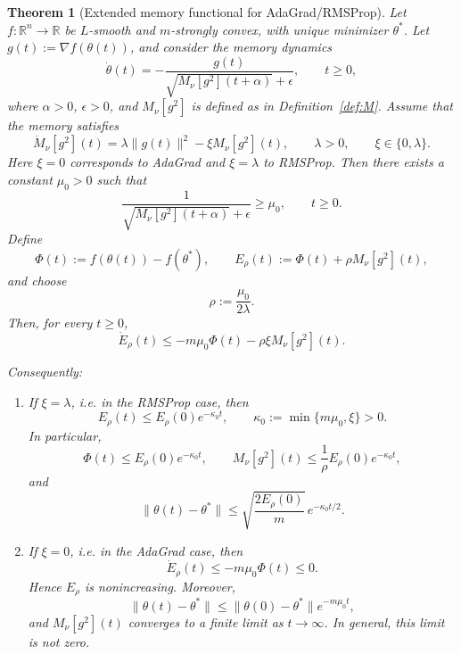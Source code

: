 \documentclass[10pt,a4paper]{amsart}
\newtheorem{theorem}{Theorem}
\begin{document}
\begin{theorem}[Extended memory functional for AdaGrad/RMSProp]
\label{thm:extended_memory_adagrad_rmsprop}
Let \(f:\mathbb R^n\to\mathbb R\) be \(L\)-smooth and \(m\)-strongly convex, with unique minimizer \(\theta^*\). Let \(g(t):=\nabla f(\theta(t))\), and consider the memory dynamics
\begin{equation}
\label{eq:shifted_memory_dynamics_thm2}
\dot\theta(t)
=
-
\frac{g(t)}
{\sqrt{M_\nu[g^2](t+\alpha)}+\epsilon},
\qquad t\ge 0,
\end{equation}
where \(\alpha>0\), \(\epsilon>0\), and \(M_\nu[g^2]\) is defined as in Definition~\ref{def:M}. Assume that the memory satisfies
\begin{equation}
\label{eq:memory_ode_thm2}
\dot M_\nu[g^2](t)
=
\lambda \|g(t)\|^2-\xi M_\nu[g^2](t),
\qquad 
\lambda>0,
\qquad 
\xi\in\{0,\lambda\}.
\end{equation}
Here \(\xi=0\) corresponds to AdaGrad and \(\xi=\lambda\) to RMSProp. Then there exists a constant \(\mu_0>0\) such that
\[
\frac{1}{\sqrt{M_\nu[g^2](t+\alpha)}+\epsilon}
\ge
\mu_0,
\qquad t\ge 0.
\]
Define
\[
\Phi(t):=f(\theta(t))-f(\theta^*),
\qquad
E_\rho(t):=\Phi(t)+\rho M_\nu[g^2](t),
\]
and choose
\[
\rho:=\frac{\mu_0}{2\lambda}.
\]
Then, for every \(t\ge 0\),
\begin{equation}
\label{eq:E_dissipation_thm2}
\dot E_\rho(t)
\le
-
m\mu_0\Phi(t)
-
\rho\xi M_\nu[g^2](t).
\end{equation}

Consequently:
\begin{enumerate}
\item If \(\xi=\lambda\), i.e. in the RMSProp case, then
\[
E_\rho(t)
\le
E_\rho(0)e^{-\kappa_0 t},
\qquad
\kappa_0:=\min\{m\mu_0,\xi\}>0.
\]
In particular,
\[
\Phi(t)\le E_\rho(0)e^{-\kappa_0 t},
\qquad
M_\nu[g^2](t)
\le
\frac{1}{\rho}E_\rho(0)e^{-\kappa_0 t},
\]
and
\[
\|\theta(t)-\theta^*\|
\le
\sqrt{\frac{2E_\rho(0)}{m}}\,e^{-\kappa_0 t/2}.
\]

\item If \(\xi=0\), i.e. in the AdaGrad case, then
\[
\dot E_\rho(t)\le -m\mu_0\Phi(t)\le 0.
\]
Hence \(E_\rho\) is nonincreasing. Moreover,
\[
\|\theta(t)-\theta^*\|
\le
\|\theta(0)-\theta^*\|e^{-m\mu_0 t},
\]
and \(M_\nu[g^2](t)\) converges to a finite limit as \(t\to\infty\). In general, this limit is not zero.
\end{enumerate}
\end{theorem}
\end{document}
